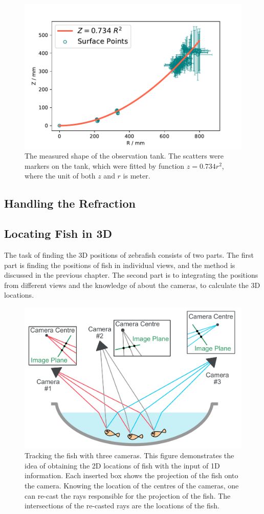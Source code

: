 \documentclass[11pt,twoside]{report}
\begin{document}
\begin{figure}
  \includegraphics[width=0.5\linewidth]{tank-fit.pdf}
  \caption[The 3D geometry of the observation tank.]{The measured shape of the observation tank. The scatters were markers on the tank, which were fitted by function $z=0.734 r^2$, where the unit of both $z$ and $r$ is meter.}
  \label{fig:tank}
\end{figure}



\subsection{Handling the Refraction}
\label{section:refraction}


\subsection{Locating Fish in 3D}
\label{section:locate_3d}

The task of finding the 3D positions of zebrafish consists of two parts. The first part is finding the positions of fish in individual views, and the method is discussed in the previous chapter. The second part is to integrating the positions from different views and the knowledge of about the cameras, to calculate the 3D locations.


\begin{figure}
  \includegraphics[width=0.8\linewidth]{track-3d-idea}
  \caption[Three dimensional tracking concept illustration]{Tracking the fish with three cameras. This figure demonstrates the idea of obtaining the 2D locations of fish with the input of 1D information. Each inserted box shows the projection of the fish onto the camera. Knowing the location of the centres of the cameras, one can re-cast the rays responsible for the projection of the fish. The intersections of the re-casted rays are the locations of the fish.}
  \label{fig:track_idea_3d}
\end{figure}
\end{document}

